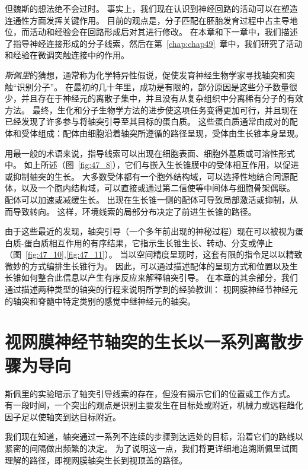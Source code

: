 但魏斯的想法绝不会过时。
事实上，我们现在认识到神经回路的活动可以在塑造连通性方面发挥关键作用。
目前的观点是，分子匹配在胚胎发育过程中占主导地位，而活动和经验会在回路形成后对其进行修改。
在本章和下一章中，我们描述了指导神经连接形成的分子线索，然后在第~\ref{chap:chap49}~章中，我们研究了活动和经验在微调突触连接中的作用。


\textit{斯佩里}的猜想，通常称为化学特异性假说，促使发育神经生物学家寻找轴突和突触“识别分子”。
在最初的几十年里，成功是有限的，部分原因是这些分子数量很少，并且存在于神经元的离散子集中，并且没有从复杂组织中分离稀有分子的有效方法。
最终，生化和分子生物学方法的进步使这项任务变得更加可行，并且现在已经发现了许多参与将轴突引导至其目标的蛋白质。
这些蛋白质通常由成对的配体和受体组成：配体由细胞沿着轴突所遵循的路径呈现，受体由生长锥本身呈现。


用最一般的术语来说，指导线索可以出现在细胞表面、细胞外基质或可溶性形式中。
如上所述（图~\ref{fig:47_8}），它们与嵌入生长锥膜中的受体相互作用，以促进或抑制轴突的生长。
大多数受体都有一个胞外结构域，可以选择性地结合同源配体，以及一个胞内结构域，可以直接或通过第二信使等中间体与细胞骨架偶联。
配体可以加速或减缓生长。
出现在生长锥一侧的配体可导致局部激活或抑制，从而导致转向。
这样，环境线索的局部分布决定了前进生长锥的路径。


由于这些最近的发现，轴突引导（一个多年前出现的神秘过程）现在可以被视为蛋白质-蛋白质相互作用的有序结果，它指示生长锥生长、转动、分支或停止（图~\ref{fig:47_10},\ref{fig:47_11}）。
当以空间精度呈现时，这套有限的指令足以以精致微妙的方式编排生长锥行为。
因此，可以通过描述配体的呈现方式和位置以及生长锥如何整合此信息以产生有序反应来解释轴突引导。
在本章的其余部分，我们通过描述两种类型的轴突的行程来说明所学到的经验教训：
视网膜神经节神经元的轴突和脊髓中特定类别的感觉中继神经元的轴突。



\section{视网膜神经节轴突的生长以一系列离散步骤为导向}

斯佩里的实验暗示了轴突引导线索的存在，但没有揭示它们的位置或工作方式。
有一段时间，一个突出的观点是识别主要发生在目标处或附近，机械力或远程趋化因子足以使轴突到达目标附近。


我们现在知道，轴突通过一系列不连续的步骤到达远处的目标，沿着它们的路线以紧密的间隔做出频繁的决定。
为了说明这一点，我们将更详细地追溯斯佩里试图理解的路径，即视网膜轴突生长到视顶盖的路径。



